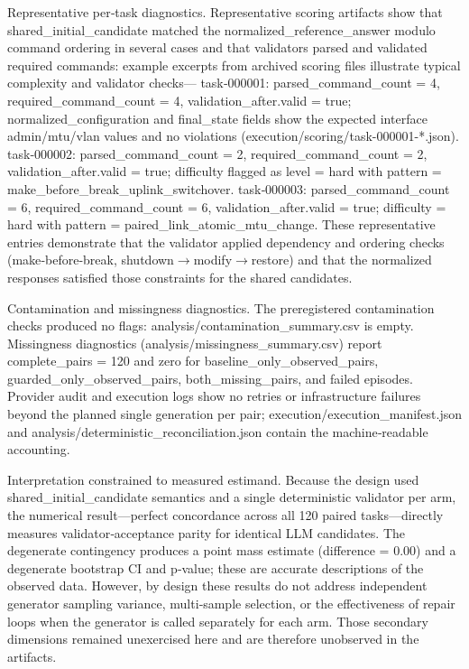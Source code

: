 \documentclass[conference]{IEEEtran}
\begin{document}
Representative per‑task diagnostics. Representative scoring artifacts show that shared\_initial\_candidate matched the normalized\_reference\_answer modulo command ordering in several cases and that validators parsed and validated required commands: example excerpts from archived scoring files illustrate typical complexity and validator checks---
\textbullet{} task‑000001: parsed\_command\_count = 4, required\_command\_count = 4, validation\_after.valid = true; normalized\_configuration and final\_state fields show the expected interface admin/mtu/vlan values and no violations (execution/scoring/task-000001-*.json).
\textbullet{} task‑000002: parsed\_command\_count = 2, required\_command\_count = 2, validation\_after.valid = true; difficulty flagged as level = hard with pattern = make\_before\_break\_uplink\_switchover.
\textbullet{} task‑000003: parsed\_command\_count = 6, required\_command\_count = 6, validation\_after.valid = true; difficulty = hard with pattern = paired\_link\_atomic\_mtu\_change.
These representative entries demonstrate that the validator applied dependency and ordering checks (make‑before‑break, shutdown\ensuremath{\rightarrow}modify\ensuremath{\rightarrow}restore) and that the normalized responses satisfied those constraints for the shared candidates.

Contamination and missingness diagnostics. The preregistered contamination checks produced no flags: analysis/contamination\_summary.csv is empty. Missingness diagnostics (analysis/missingness\_summary.csv) report complete\_pairs = 120 and zero for baseline\_only\_observed\_pairs, guarded\_only\_observed\_pairs, both\_missing\_pairs, and failed episodes. Provider audit and execution logs show no retries or infrastructure failures beyond the planned single generation per pair; execution/execution\_manifest.json and analysis/deterministic\_reconciliation.json contain the machine‑readable accounting.

Interpretation constrained to measured estimand. Because the design used shared\_initial\_candidate semantics and a single deterministic validator per arm, the numerical result---perfect concordance across all 120 paired tasks---directly measures validator‑acceptance parity for identical LLM candidates. The degenerate contingency produces a point mass estimate (difference = 0.00) and a degenerate bootstrap CI and p‑value; these are accurate descriptions of the observed data. However, by design these results do not address independent generator sampling variance, multi‑sample selection, or the effectiveness of repair loops when the generator is called separately for each arm. Those secondary dimensions remained unexercised here and are therefore unobserved in the artifacts.
\end{document}
